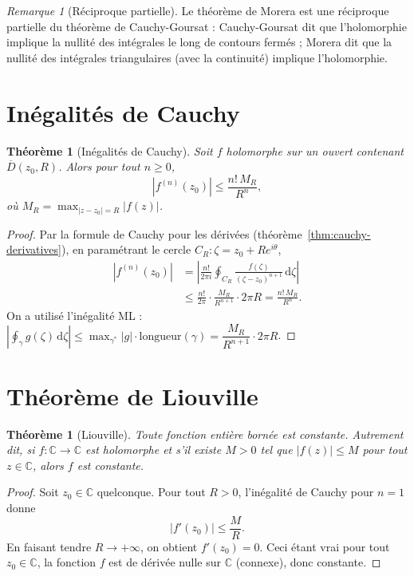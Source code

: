 \documentclass[12pt,a4paper,openany]{book}
\theoremstyle{definition}
\theoremstyle{plain}
\newtheorem{theoreme}[definition]{Théorème}
\theoremstyle{remark}
\newtheorem{remarque}[definition]{Remarque}
\newcommand{\C}{\mathbb{C}}
\newcommand{\dd}{\mathrm{d}}
\newcommand{\abs}[1]{\left|#1\right|}
\begin{document}
\begin{remarque}[Réciproque partielle]\label{rem:morera-reciproque}
Le théorème de Morera est une réciproque partielle du théorème de
Cauchy-Goursat : Cauchy-Goursat dit que l'holomorphie implique la
nullité des intégrales le long de contours fermés ; Morera dit que
la nullité des intégrales triangulaires (avec la continuité) implique
l'holomorphie.
\end{remarque}

\section{Inégalités de Cauchy}

\begin{theoreme}[Inégalités de Cauchy]\label{thm:cauchy-inequalities}
Soit $f$ holomorphe sur un ouvert contenant $\overline{D}(z_0, R)$. Alors
pour tout $n \geq 0$,
\[
  \abs{f^{(n)}(z_0)} \leq \frac{n!\,M_R}{R^n},
\]
où $M_R = \max_{\abs{z - z_0} = R} \abs{f(z)}$.
\end{theoreme}

\begin{proof}
Par la formule de Cauchy pour les dérivées
(théorème~\ref{thm:cauchy-derivatives}), en paramétrant le cercle
$C_R : \zeta = z_0 + Re^{i\theta}$,
\begin{align*}
  \abs{f^{(n)}(z_0)}
  &= \abs{\frac{n!}{2\pi i}\oint_{C_R}
     \frac{f(\zeta)}{(\zeta - z_0)^{n+1}}\,\dd\zeta} \\
  &\leq \frac{n!}{2\pi} \cdot \frac{M_R}{R^{n+1}} \cdot 2\pi R
  = \frac{n!\,M_R}{R^n}.
\end{align*}
On a utilisé l'inégalité ML : $\abs{\oint_\gamma g(\zeta)\,\dd\zeta}
\leq \max_{\gamma^*}\abs{g} \cdot \text{longueur}(\gamma) = \dfrac{M_R}{R^{n+1}}
\cdot 2\pi R$.
\end{proof}

\section{Théorème de Liouville}

\begin{theoreme}[Liouville]\label{thm:liouville}
Toute fonction entière bornée est constante. Autrement dit, si
$f \colon \C \to \C$ est holomorphe et s'il existe $M > 0$ tel que
$\abs{f(z)} \leq M$ pour tout $z \in \C$, alors $f$ est constante.
\end{theoreme}

\begin{proof}
Soit $z_0 \in \C$ quelconque. Pour tout $R > 0$, l'inégalité de Cauchy
pour $n = 1$ donne
\[
  \abs{f'(z_0)} \leq \frac{M}{R}.
\]
En faisant tendre $R \to +\infty$, on obtient $f'(z_0) = 0$. Ceci étant
vrai pour tout $z_0 \in \C$, la fonction $f$ est de dérivée nulle sur
$\C$ (connexe), donc constante.
\end{proof}
\end{document}
